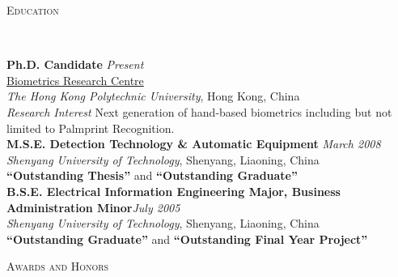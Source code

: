 \documentclass{article}
\newenvironment{changemargin}[2]{%
  \begin{list}{}{%
    \setlength{\topsep}{0pt}%
    \setlength{\leftmargin}{#1}%
    \setlength{\rightmargin}{#2}%
    \setlength{\listparindent}{\parindent}%
    \setlength{\itemindent}{\parindent}%
    \setlength{\parsep}{\parskip}%
  }%
  \item[]}{\end{list}
}
\newcommand{\lineover}{
	\begin{changemargin}{-0.05in}{-0.05in}
		\vspace*{-8pt}
		\hrulefill \\
		\vspace*{-2pt}
	\end{changemargin}
}
\newcommand{\header}[1]{
	\begin{changemargin}{-0.5in}{-0.5in}
		\scshape{#1}\\
  	\lineover
	\end{changemargin}
}
\newenvironment{body} {
	\vspace*{-16pt}
	\begin{changemargin}{-0.25in}{-0.5in}
  }	
	{\end{changemargin}
}
\begin{document}
\medskip


\header{Education}

\begin{body}
	\vspace{14pt}
	\textbf{Ph.D. Candidate}{} \hfill \emph{Present}{} \\
    \href{http://www.comp.polyu.edu.hk/~biometrics/}{Biometrics Research Centre}\\
	\emph{The Hong Kong Polytechnic University}, Hong Kong, China{} \\
    \emph{Research Interest}{} {Next generation of hand-based biometrics including but not limited to Palmprint Recognition.}{}\\
  \medskip
	\textbf{M.S.E. Detection Technology \& Automatic Equipment}{} \hfill \emph{March 2008}{}\\
	\emph{Shenyang University of Technology}, Shenyang, Liaoning, China{} \\
	\textbf{``Outstanding Thesis''} and
    \textbf{``Outstanding Graduate''}\\
  \medskip
	\textbf{B.S.E. Electrical Information Engineering Major, Business Administration Minor}\hfill \emph{July 2005} \\
    \emph{Shenyang University of Technology}, Shenyang, Liaoning, China{} \\
    \textbf{``Outstanding Graduate''} and
    \textbf{``Outstanding Final Year Project''}\\
\end{body}

\medskip


\header{Awards and Honors}
\end{document}
